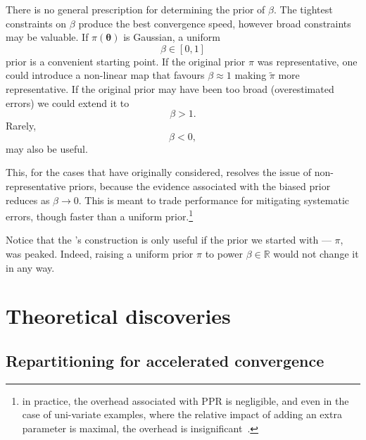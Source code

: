 \documentclass[usenatbib]{mnras}
\begin{document}
There is no general prescription for determining the prior of
\(\beta\). The tightest constraints on \(\beta\) produce the best
convergence speed, however broad constraints may be valuable.  If
\(\pi(\bm{\theta})\) is Gaussian, a uniform 
\[\beta\in[0,1]\] prior is a convenient starting point.
If the original prior \(\pi\) was representative, one could introduce
a non-linear map that favours \(\beta\approx 1\) making
\(\tilde{\pi}\) more representative. If the original prior may have
been too broad (overestimated errors) we could extend it
to \[\beta>1.\] Rarely, \[\beta<0,\] may also be useful.

This, for the cases that \citeauthor{chen-ferroz-hobson} have
originally considered, resolves the issue of non-representative
priors, because the evidence associated with the biased prior reduces
as \(\beta\rightarrow0\). This is meant to trade performance for
mitigating systematic errors, though faster than a uniform
prior.\footnote{in practice, the overhead associated with PPR is
  negligible, and even in the case of uni-variate examples, where the
  relative impact of adding an extra parameter is maximal, the
  overhead is insignificant~\cite[see][section ``numerical
  examples'']{chen-ferroz-hobson}.}

Notice that the \citeauthor{chen-ferroz-hobson}'s construction is
only useful if the prior we started with --- \(\pi\), was
peaked. Indeed, raising a uniform prior \(\pi\) to power \(\beta \in
   \mathbb{R}\) would not change it in any way.

\section{Theoretical discoveries}
\subsection{Repartitioning for  accelerated convergence\label{sec:accelerating}}
\end{document}
